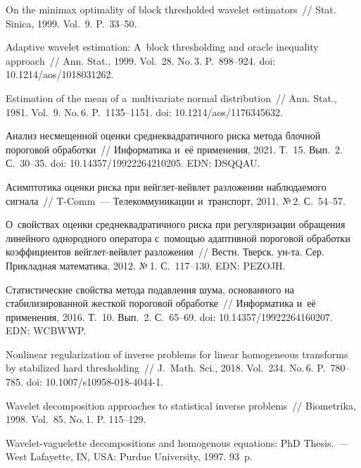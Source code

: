 \begin{multicols}{2}
{{\begin{thebibliography}{99}
 \vspace*{-3pt}

 On the minimax optimality of block 
thresholded wavelet estimators~// Stat. Sinica, 1999. Vol.~9. P.~33--50.

 Adaptive wavelet estimation: A~block thresholding and oracle 
inequality approach~// Ann. Stat., 1999. Vol.~28. No.\,3. P.~898--924.
doi: 10.1214/aos/1018031262.

 Estimation of the mean of a~multivariate normal distribution~// Ann. Stat., 1981. Vol.~9. No.\,6. P.~1135--1151.
doi: 10.1214/aos/1176345632.

 Анализ несмещенной оценки среднеквадратичного риска 
метода блочной пороговой обработки~// Информатика и~её применения, 2021.  Т.~15. 
Вып.~2. С.~30--35. doi: 10.14357/19922264210205. EDN: DSQQAU.

 Асимптотика оценки риска при вейг\-лет-вейв\-лет 
разложении наблюдаемого сигнала~// T-Comm~--- Телекоммуникации 
и~транспорт, 2011. №\,2. С.~54--57.

  О~свойствах оценки среднеквадратичного риска при 
регуляризации обращения линейного однородного оператора с~по\-мощью адаптивной 
пороговой обработки коэффициентов вейг\-лет-вейв\-лет разложения~// Вестн. Тверск. 
ун-та. Сер. Прикладная математика, 2012. №\,1. С.~117--130. EDN: PEZOJH.

 Статистические свойства метода подавления шума, 
основанного на стабилизированной жесткой пороговой обработке~// Информатика и~её 
применения, 2016.  Т.~10. Вып.~2. С.~65--69. doi: 10.14357/19922264160207. EDN: WCBWWP.

 Nonlinear regularization of inverse problems for linear 
homogeneous transforms by stabilized hard thresholding~// J.~Math. Sci., 2018. 
Vol.~234. No.\,6. P.~780--785. doi: 10.1007/s10958-018-4044-1.

 Wavelet decomposition approaches to 
statistical inverse problems~// Biometrika, 1998. Vol.~85. No.\,1. P. 115--129.

 Wavelet-vaguelette decompositions and homogenous equations: PhD 
Thesis.~--- West Lafayette, IN, USA: Purdue University, 1997. 93~p.


\end{thebibliography}}}
\end{multicols}
